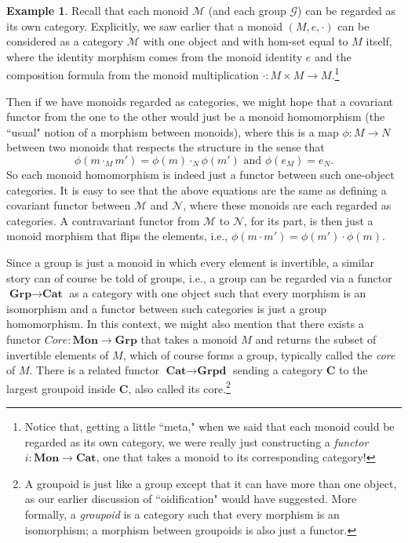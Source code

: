 \documentclass[a4paper]{book}
\theoremstyle{definition}
\newtheorem{example}{Example}[section]
\theoremstyle{definition}
\theoremstyle{definition}
\theoremstyle{theorem}
\theoremstyle{definition}
\begin{document}
	\begin{example}  
	Recall that each monoid $\mathcal{M}$ (and each group $\mathcal{G}$) can be regarded as its own category. Explicitly, we saw earlier that a monoid $(M, e, \cdot)$ can be considered as a category $\mathcal{M}$ with one object and with hom-set equal to $M$ itself, where the identity morphism comes from the monoid identity $e$ and the composition formula from the monoid multiplication $\cdot: M \times M \rightarrow M$.\footnote{Notice that, getting a little ``meta," when we said that each monoid could be regarded as its own category, we were really just constructing a \textit{functor} $i: \textbf{Mon} \rightarrow \textbf{Cat}$, one that takes a monoid to its corresponding category!} \par 
	Then if we have monoids  regarded as categories, we might hope that a covariant functor from the one to the other would just be a monoid homomorphism (the ``usual" notion of a morphism between monoids), where this is a map $\phi: M \rightarrow N$ between two monoids that respects the structure in the sense that 
	\begin{equation*}
	\phi(m \cdot_M m') = \phi(m) \cdot_N \phi(m') \text{ and } \phi(e_M) = e_N.  
	\end{equation*} 
	So each monoid homomorphism is indeed just a functor between such one-object categories. It is easy to see that the above equations are the same as defining a covariant functor between $\mathcal{M}$ and $\mathcal{N}$, where these monoids are each regarded as categories. A contravariant functor from $\mathcal{M}$ to $\mathcal{N}$, for its part, is then just a monoid morphism that flips the elements, i.e., $\phi(m \cdot m') = \phi(m') \cdot \phi(m)$.  \par 
	Since a group is just a monoid in which every element is invertible, a similar story can of course be told of groups,  i.e., a group can be regarded via a functor $\textbf{Grp} \rightarrow \textbf{Cat}$ as a category with one object such that every morphism is an isomorphism and a functor between such categories is just a group homomorphism. In this context, we might also mention that there exists a functor $Core: \textbf{Mon} \rightarrow \textbf{Grp}$ that takes a monoid $M$ and returns the subset of invertible elements of $M$, which of course forms a group, typically called the \textit{core} of $M$. There is a related functor $\textbf{Cat} \rightarrow \textbf{Grpd}$ sending a category $\textbf{C}$ to the largest groupoid inside \textbf{C}, also called its core.\footnote{A groupoid is just like a group except that it can have more than one object, as our earlier discussion of ``oidification"  would have suggested. More formally, a \textit{groupoid} is a category such that every morphism is an isomorphism; a morphism between groupoids is also just a functor.}
\end{example}
\end{document}

